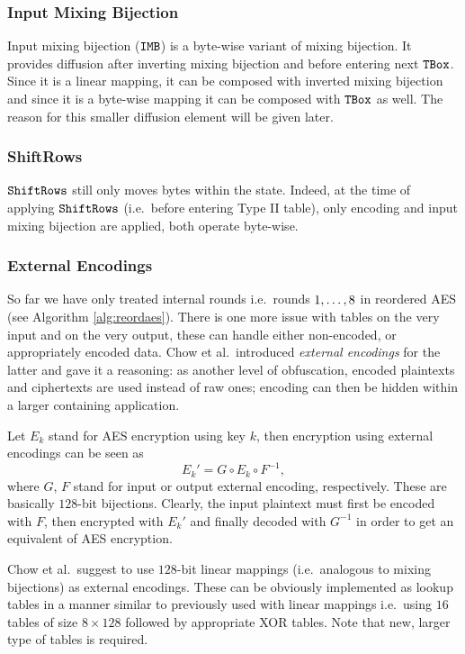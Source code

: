 \subsubsection{Input Mixing Bijection}
	
	Input mixing bijection ($\texttt{IMB}$) is a byte-wise variant of mixing bijection. It provides diffusion after inverting mixing bijection and before entering next $\texttt{TBox}$. Since it is a linear mapping, it can be composed with inverted mixing bijection and since it is a byte-wise mapping it can be composed with $\texttt{TBox}$ as well. The reason for this smaller diffusion element will be given later.

\subsubsection{ShiftRows}
	
	$\texttt{ShiftRows}$ still only moves bytes within the state. Indeed, at the time of applying $\texttt{ShiftRows}$ (i.e.\ before entering Type II table), only encoding and input mixing bijection are applied, both operate byte-wise.

\subsubsection{External Encodings}
	
	So far we have only treated internal rounds i.e.\ rounds $1 , \ldots , 8$ in reordered AES (see Algorithm \ref{alg:reordaes}). There is one more issue with tables on the very input and on the very output, these can handle either non-encoded, or appropriately encoded data. Chow et al.\ introduced {\em external encodings} for the latter and gave it a reasoning: as another level of obfuscation, encoded plaintexts and ciphertexts are used instead of raw ones; encoding can then be hidden within a larger containing application. %
	
	Let $E_k$ stand for AES encryption using key $k$, then encryption using external encodings can be seen as
	\begin{equation}
		E_k' = G \circ E_k \circ F^{-1} ,
	\end{equation}
	where $G$, $F$ stand for input or output external encoding, respectively. These are basically $128$-bit bijections. Clearly, the input plaintext must first be encoded with $F$, then encrypted with $E_k'$ and finally decoded with $G^{-1}$ in order to get an equivalent of AES encryption.
	
	Chow et al.\ suggest to use $128$-bit linear mappings (i.e.\ analogous to mixing bijections) as external encodings. These can be obviously implemented as lookup tables in a manner similar to previously used with linear mappings i.e.\ using $16$ tables of size $8\times 128$ followed by appropriate XOR tables. Note that new, larger type of tables is required.
	
